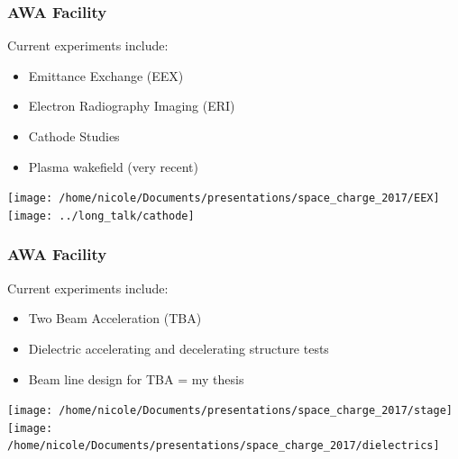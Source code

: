 \documentclass[professionalfonts,t]{beamer}
\begin{document}
\begin{frame}
\frametitle{AWA Facility}
Current experiments include:
\begin{itemize}
	\item{Emittance Exchange (EEX)}
	\item{Electron Radiography Imaging (ERI)}
	\item{Cathode Studies}
	\item Plasma wakefield (very recent)
\end{itemize}
\vspace{0.3cm}
\centering
\texttt{[image: /home/nicole/Documents/presentations/space\_charge\_2017/EEX]}\hspace{0.5em}%
\texttt{[image: ../long\_talk/cathode]}
\end{frame}

\begin{frame}
\frametitle{AWA Facility}
Current experiments include:
\begin{itemize}
	\item{Two Beam Acceleration (TBA)}
	\item{Dielectric accelerating and decelerating structure tests}
	\item{Beam line design for TBA = my thesis}
\end{itemize}
\vspace{0.5cm}
\texttt{[image: /home/nicole/Documents/presentations/space\_charge\_2017/stage]}\hfill\texttt{[image: /home/nicole/Documents/presentations/space\_charge\_2017/dielectrics]}
\end{frame}
\end{document}
